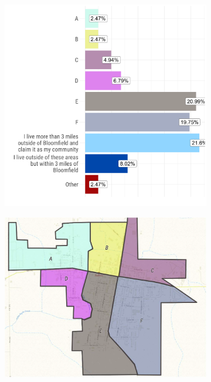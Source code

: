 \begin{figure}[ht!]
\centering
\begin{framed}
    \caption{Community Survey Neighborhoods}
    \label{fig:neighborhoods}

     \begin{subfigure}{0.49\textwidth}
        \centering
        \includegraphics[width=\linewidth]{figures/survey_respondent_neighborhoods.png}
     \end{subfigure}
     \begin{subfigure}{0.49\textwidth}
        \centering
        \includegraphics[width=\linewidth]{figures/community_survey_neighborhoods.png}
     \end{subfigure}
\end{framed}
\end{figure}


